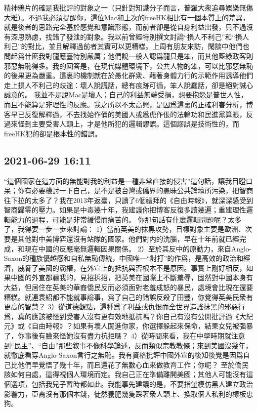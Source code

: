 \documentclass[twocolumn]{ctexart}
\begin{document}
精神鴉片的確是我批評的對象之一（只針對知識分子而言，普羅大衆追尋娛樂無傷大雅）。不過我必須提醒你，這位Mac和上次的freeHK相比有一個本質上的差異，就是後者的思路完全基於感覺和意識形態，而前者卻是從自身利益出發，只不過沒有深思熟慮，找錯了發泄的對象。我以前曾經特別撰文討論“損人不利己”和“損人利己”的對比，並且解釋過前者其實可以更糟糕。上周有朋友來訪，閑談中他們也問起爲什麽我對龍應臺特別嚴厲；他們說一般人認爲龍只是笨，而其他藍綠政客則邪惡無恥得多。我的回答是，在現代媒體環境下，公共人物的笨，可以比邪惡無恥的後果更為嚴重。這裏的機制就在於愚化群衆、藉著身體力行的示範作用誘導他們走上損人不利己的歧途：壞人說謊話，總有痕跡可循，笨人說蠢話，卻是絕對誠心誠意的。 我並不是說Mac是壞人；自己的利益無端受損，想要抱怨是普世人性，而且不能算是非理性的反應。我之所以不太高興，是因爲這裏的正確利害分析，博客早已反復解釋過，不去找始作俑的美國人或爲虎作倀的法輪功和民進黨算賬，反過來怪到主要受害人頭上，才是他所犯的邏輯謬誤。這個謬誤是技術性的，而freeHK犯的卻是根本性的錯誤。
\subsection*{2021-06-29 16:11}

“這個國家在這方面的無能對我的利益是一種非常直接的侵害”這句話，讓我目瞪口呆；你有必要檢討一下自己，是不是被台灣或僑界的愚昧公共論壇所污染，把智商往下拉的太多了？我在2013年返臺，只讀了6個禮拜的《自由時報》，就深深感受到智商歸零的壓力。如果是中毒幾十年，我建議你把博客反復多讀幾遍；重建理性邏輯能力的過程，可能是非常緩慢而痛苦的。
你那句話有什麽邏輯問題呢？太多了，我得要一步一步來討論：
1）當前英美的抹黑攻勢，目標對象主要是歐洲、次要是其他對中美博弈還沒有站隊的國家。他們對内的洗腦，早在十年前就已經完成，和現在中國的反應毫無邏輯因果關係。
2）至於其反中的原動力，來自Anglo-Saxon的種族優越感和自私無恥傳統，中國唯一“討打”的作爲，是高效的政治和經濟，威脅了美國的霸權，在外宣上的抵抗與否根本不是原因。事實上剛好相反，如果中國的外宣都聼我的，見招拆招，把英美在國際上不斷羞辱，固然對中國本身有大益，但居住在英美的華裔僑民反而必須面對老羞成怒的暴民，處境會比現在還要糟糕。就連袁紹都不能就事論事，爲了自己的錯誤反殺了田豐，你覺得英美民衆有更高的智慧？
3）從道德觀點，這種爲了利益或仇恨而全世界造謠抹黑的邪惡行爲，真的應該被怪到受害人沒有更有效地抵抗嗎？你自己有沒有公開批評過《大紀元》或《自由時報》？如果有壞人闖進你家，你選擇躲起來保命，結果女兒被强暴了，你事後有臉來怪她沒有盡力抗拒嗎？
4）從時間來看，我在中學時期就注意到“民主”、“自由”那些敘事不像科學論述，反而類似宗教教條；來到美國沒幾年，就徹底看穿Anglo-Saxon言行之無恥。我有資格批評中國外宣的後知後覺是因爲自己比他們早覺悟了幾十年，而且還花了無數心血來做教育工作；你呢？
至於僑民該如何自處，這得視個人環境而定。我自己正在準備離開美國；其他人可能沒有這個選項，包括我兒子暫時都如此。我能事先建議的是，不要指望模仿黑人建立政治影響力，亞裔沒有那個本錢，徒然養肥幾隻踩著衆人頭上、換取個人私利的樣板忠狗。
\end{document}
